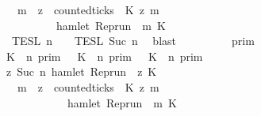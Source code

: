 \begin{isabellebody}
\ \ \ \ \ \ \ \ \ \ \ \ \ \ \ \ \ \ \ \ {\isacharparenleft}{\isasymforall}m\ {\isasymge}\ z{\isachardot}\ \ counted{\isacharunderscore}ticks\ {\isasymrho}\ K\ z\ m\ {}\isanewline
\ \ \ \ \ \ \ \ \ \ \ \ \ \ \ \ \ \ \ \ \ \ \ \ \ \ {\isasymlongrightarrow}\ hamlet\ {\isacharparenleft}{\isacharparenleft}Rep{\isacharunderscore}run\ {\isasymrho}{\isacharparenright}\ m\ K\ {\isacharbraceright}\isanewline
\ \ \ \ \ \ \ \ \ \ \ \ \ \ \ \ {\isasyminter}\ {\isasymlbrakk}{\isasymlbrakk}\ {\isasymPsi}\ {\isasymrbrakk}{\isasymrbrakk}\isactrlsub T\isactrlsub E\isactrlsub S\isactrlsub L\isactrlbsup {\isasymge}\ n\isactrlesup \ {\isasyminter}\ {\isasymlbrakk}{\isasymlbrakk}\ {\isasymPhi}\ {\isasymrbrakk}{\isasymrbrakk}\isactrlsub T\isactrlsub E\isactrlsub S\isactrlsub L\isactrlbsup {\isasymge}\ Suc\ n\isactrlesup {\isacartoucheclose}\ \isamarkupfalse%
\ blast\isanewline
\ \ \isamarkupfalse%
\ \isamarkupfalse%
\ {\isacartoucheopen}{\isachardot}{\isachardot}{\isachardot}\ {\isacharequal}\ {\isasymlbrakk}{\isasymlbrakk}\ {\isasymGamma}\ {\isasymrbrakk}{\isasymrbrakk}\isactrlsub p\isactrlsub r\isactrlsub i\isactrlsub m\isanewline
\ \ \ \ \ \ \ \ \ \ \ \ \ \ \ \ {\isasyminter}\ {\isacharparenleft}{\isasymlbrakk}\ K\ {\isasymnot}{\isasymUp}\ n\ {\isasymrbrakk}\isactrlsub p\isactrlsub r\isactrlsub i\isactrlsub m\ {\isasymunion}\ {\isacharparenleft}{\isasymlbrakk}\ K\ {\isasymUp}\ n\ {\isasymrbrakk}\isactrlsub p\isactrlsub r\isactrlsub i\isactrlsub m\ {\isasyminter}\ {\isasymlbrakk}\ K\ {\isasymUp}\ n\ {\isasymrbrakk}\isactrlsub p\isactrlsub r\isactrlsub i\isactrlsub m{\isacharparenright}{\isacharparenright}\isanewline
\ \ \ \ \ \ \ \ \ \ \ \ \ \ \ \ {\isasyminter}\ {\isacharbraceleft}{\isasymrho}{\isachardot}\ {\isasymforall}z{\isasymge}\ Suc\ n{\isachardot}\ hamlet\ {\isacharparenleft}{\isacharparenleft}Rep{\isacharunderscore}run\ {\isasymrho}{\isacharparenright}\ z\ K\ {\isasymlongrightarrow}\isanewline
\ \ \ \ \ \ \ \ \ \ \ \ \ \ \ \ \ \ \ \ {\isacharparenleft}{\isasymforall}m\ {\isasymge}\ z{\isachardot}\ \ counted{\isacharunderscore}ticks\ {\isasymrho}\ K\ z\ m\ {}\isanewline
\ \ \ \ \ \ \ \ \ \ \ \ \ \ \ \ \ \ \ \ \ \ \ \ \ \ \ \ {\isasymlongrightarrow}\ hamlet\ {\isacharparenleft}{\isacharparenleft}Rep{\isacharunderscore}run\ {\isasymrho}{\isacharparenright}\ m\ K\ {\isacharbraceright}\isanewline

\end{isabellebody}
